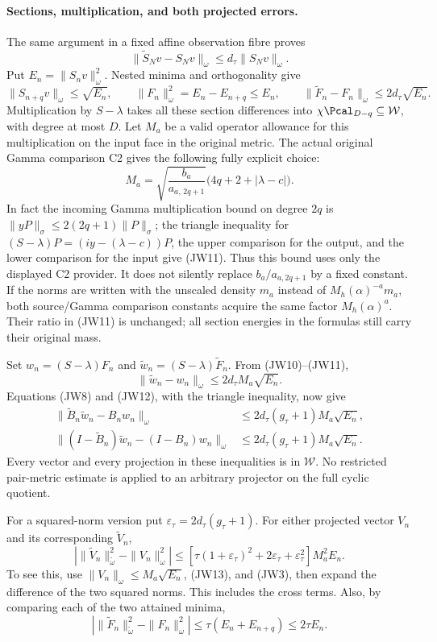 \paragraph{Sections, multiplication, and both projected errors.}
The same argument in a fixed affine observation fibre proves
\[
\|\widetilde S_Nv-S_Nv\|_\omega
\le d_\tau\|S_Nv\|_\omega.
\tag{JW9}
\]
Put \(E_n=\|S_nv\|_\omega^2\).
Nested minima and orthogonality give
\[
\|S_{n+q}v\|_\omega\le\sqrt{E_n},\qquad
\|F_n\|_\omega^2=E_n-E_{n+q}\le E_n,\qquad
\|\widetilde F_n-F_n\|_\omega\le2d_\tau\sqrt{E_n}.
\tag{JW10}
\]
Multiplication by \(S-\lambda\) takes all these section differences
into \(\chi\Pcal_{D-q}\subseteq\mathcal W\), with degree at most \(D\).
Let \(M_a\) be a valid operator allowance for this multiplication on
the input face in the original metric.  The actual original
Gamma comparison C2 gives the following fully explicit choice:
\[
M_a=
\sqrt{\frac{b_a}{a_{a,\,2q+1}}}
\bigl(4q+2+|\lambda-c|\bigr).
\tag{JW11}
\]
In fact the incoming Gamma multiplication bound on degree \(2q\)
is \(\|yP\|_\sigma\le2(2q+1)\|P\|_\sigma\);
the triangle inequality for
\((S-\lambda)P=(iy-(\lambda-c))P\), the upper comparison for the output,
and the lower comparison for the input give (JW11).
Thus this bound uses only the displayed C2 provider.  It does not
silently replace \(b_a/a_{a,2q+1}\) by a fixed constant.
If the norms are written with the unscaled density \(m_a\) instead of
\(M_h(\alpha)^{-a}m_a\), both source/Gamma comparison constants acquire
the same factor \(M_h(\alpha)^a\).  Their ratio in (JW11) is unchanged;
all section energies in the formulas still carry their original mass.

Set \(w_n=(S-\lambda)F_n\) and
\(\widetilde w_n=(S-\lambda)\widetilde F_n\).  From (JW10)--(JW11),
\[
\|\widetilde w_n-w_n\|_\omega
\le2d_\tau M_a\sqrt{E_n}.
\tag{JW12}
\]
Equations (JW8) and (JW12), with the triangle inequality, now give
\[
\begin{split}
\|\widetilde B_n\widetilde w_n-B_nw_n\|_\omega
&\le2d_\tau(g_\tau+1)M_a\sqrt{E_n},\\
\|(I-\widetilde B_n)\widetilde w_n-(I-B_n)w_n\|_\omega
&\le2d_\tau(g_\tau+1)M_a\sqrt{E_n}.
\end{split}
\tag{JW13}
\]
Every vector and every projection in these inequalities is in
\(\mathcal W\).  No restricted pair-metric estimate is applied to
an arbitrary projector on the full cyclic quotient.

For a squared-norm version put
\(\varepsilon_\tau=2d_\tau(g_\tau+1)\).
For either projected vector \(V_n\) and its corresponding
\(\widetilde V_n\),
\[
\left|\|\widetilde V_n\|_{\widetilde\omega}^2
              -\|V_n\|_\omega^2\right|
\le
\left[\tau(1+\varepsilon_\tau)^2
      +2\varepsilon_\tau+\varepsilon_\tau^2\right]M_a^2E_n.
\tag{JW14}
\]
To see this, use \(\|V_n\|_\omega\le M_a\sqrt{E_n}\),
(JW13), and (JW3), then expand the difference of the two squared
norms.  This includes the cross terms.
Also, by comparing each of the two attained minima,
\[
\left|\|\widetilde F_n\|_{\widetilde\omega}^2
              -\|F_n\|_\omega^2\right|
\le\tau(E_n+E_{n+q})\le2\tau E_n.
\tag{JW15}
\]


